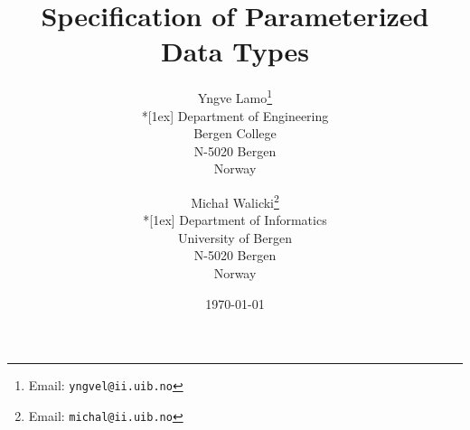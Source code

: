 \documentclass[12pt]{IIreport}
\begin{document}

\title{Specification of Parameterized Data Types} 
\author{Yngve Lamo\thanks{Email: \texttt{yngvel@ii.uib.no}} \\*[1ex] Department of
Engineering \\ Bergen College \\  N-5020 Bergen \\ Norway
\and Micha{\l} Walicki\thanks{Email: \texttt{michal@ii.uib.no}} \\*[1ex] Department of
  Informatics \\ University of Bergen \\ N-5020 Bergen \\ Norway}


\date{\today}
\maketitle





\end{document}
